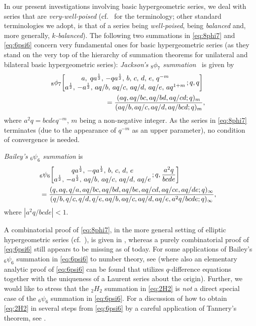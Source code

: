 \documentclass[reqno,12pt]{amsart}
\theoremstyle{remark}
\numberwithin{equation}{section}
\begin{document}
In our present investigations involving basic hypergeometric series, we
deal with series that are \textit{very-well-poised}
(cf.\ \cite{GR} for the terminology; other standard terminologies we
adopt, is that of a series being \textit{well-poised}, being
\textit{balanced} and, more generally, \textit{$k$-balanced}).
The following two summations in \eqref{eq:8phi7} and \eqref{eq:6psi6}
concern very fundamental ones for basic hypergeometric series
(as they stand on the very top of the hierarchy of summation theorems
for unilateral and bilateral basic hypergeometric series):
\textit{Jackson's ${}_8\phi_7$ summation}~\cite[Equation~(2.6.2)]{GR}
is given by
\begin{align}\label{eq:8phi7}
{}_8\phi_7\!\left[\begin{matrix}a,\;qa^{\frac12},\,-qa^{\frac12},\,
b,\,c,\,d,\,e,\,q^{-m}\\
a^{\frac12},\,-a^{\frac12},\,aq/b,\,aq/c,\,aq/d,\,aq/e,\,aq^{1+m}\end{matrix}
  \,;q,q\right]&\notag\\
  =\frac{(aq,aq/bc,aq/bd,aq/cd;q)_m}
{(aq/b,aq/c,aq/d,aq/bcd;q)_m}&,
\end{align}
where $a^2q=bcdeq^{-m}$, $m$ being a non-negative integer.
As the series in \eqref{eq:8phi7} terminates (due to the appearance
of $q^{-m}$ as an upper parameter),
no condition of convergence is needed.

\textit{Bailey's ${}_6\psi_6$ summation} \cite[Equation~(5.3.1)]{GR} is
\begin{align}\label{eq:6psi6}
&{}_6\psi_6\!\left[\begin{matrix}qa^{\frac12},\,-qa^{\frac12},\,
b,\,c,\,d,\,e\\
a^{\frac12},\,-a^{\frac12},\,aq/b,\,aq/c,\,aq/d,\,aq/e\end{matrix}
  \,;q,\frac{a^2q}{bcde}\right]\notag\\
&=\frac{(q,aq,q/a,aq/bc,aq/bd,aq/be,aq/cd,aq/ce,aq/de;q)_\infty}
{(q/b,q/c,q/d,q/e,aq/b,aq/c,aq/d,aq/e,a^2q/bcde;q)_\infty},
\end{align}
where $|a^2q/bcde|<1$.

A combinatorial proof of \eqref{eq:8phi7}, in the more general
setting of elliptic hypergeometric series (cf.\ \cite[Chapter~11]{GR}),
is given in \cite[Equations~(2.18)--(2.20)]{S4}, whereas a purely
combinatorial proof of \eqref{eq:6psi6} still appears to be missing
as of today. For some applications of Bailey's ${}_6\psi_6$ summation
in \eqref{eq:6psi6} to number theory, see \cite[Section~3]{A} (where
also an elementary analytic proof of \eqref{eq:6psi6} can be found that
utilizes $q$-difference equations together with the uniqueness of a
Laurent series about the origin).
Further, we would like to stress that the $_2H_2$ summation
in \eqref{eq:2H2} is \textit{not} a direct special case of
the $_6\psi_6$ summation in \eqref{eq:6psi6}.
For a discussion of how to obtain \eqref{eq:2H2}
in several steps from \eqref{eq:6psi6} by a careful application
of Tannery's theorem, see \cite{BT}.
\end{document}
